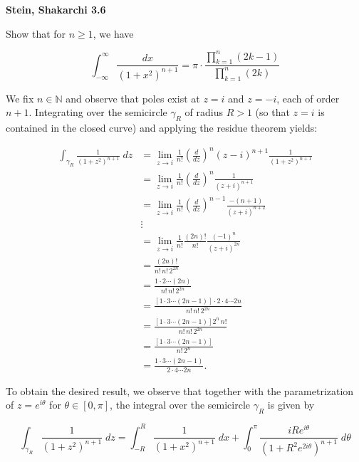 \textbf{Stein, Shakarchi 3.6}

Show that for $n \ge 1$, we have

$$
  \int_{-\infty}^{\infty} {\frac{dx}{\left( 1 + x^2 \right)^{n+1}}} = \pi \cdot \frac{\prod\limits_{k=1}^{n} (2k - 1)}{\prod\limits_{k=1}^{n} (2k)}
$$

\begin{solution}
  We fix $n \in \mathbb{N}$ and observe that poles exist at $z = i$ and $z = -i$, each of order $n + 1$. Integrating 
  over the semicircle $\gamma_R$ of radius $R > 1$ (so that $z = i$ is contained in the closed curve) and applying the 
  residue theorem yields:

  \begin{align*}
    \int_{\gamma_R} { \frac{1}{(1 + z^2)^{n+1}} \; dz } 
      &= \lim\limits_{z \to i} \frac{1}{n!} \left(\frac{d}{dz}\right)^n (z - i)^{n+1} \frac{1}{(1 + z^2)^{n+1}} \\
      &= \lim\limits_{z \to i} \frac{1}{n!} \left(\frac{d}{dz}\right)^n \frac{1}{(z + i)^{n+1}} \\
      &= \lim\limits_{z \to i} \frac{1}{n!} \left(\frac{d}{dz}\right)^{n-1} \frac{-(n+1)}{(z + i)^{n+2}} \\
      &\vdots \\
      &= \lim\limits_{z \to i} \frac{1}{n!} \frac{(2n)!}{n!} \frac{(-1)^n}{(z + i)^{2n}} \\
      &= \frac{(2n)!}{n! \, n! \, 2^{2n}} \\
      &= \frac{1 \cdot 2 \cdots (2n)}{n! \, n! \, 2^{2n}} \\
      &= \frac{[1 \cdot 3 \cdots (2n - 1)] \cdot 2 \cdot 4 \cdots 2n}{n! \, n! \, 2^{2n}} \\
      &= \frac{[1 \cdot 3 \cdots (2n - 1)] 2^n \, n!}{n! \, n! \, 2^{2n}} \\
      &= \frac{[1 \cdot 3 \cdots (2n - 1)]}{n! \, 2^n} \\
      &= \frac{1 \cdot 3 \cdots (2n - 1)}{2 \cdot 4 \cdots 2n}.
  \end{align*}

  To obtain the desired result, we observe that together with the parametrization of 
  $z = e^{i \theta}$ for $\theta \in [0, \pi]$, the integral over the semicircle $\gamma_R$ is given by

  $$
    \int_{\gamma_R} { \frac{1}{(1 + z^2)^{n+1}} \; dz } = \int_{-R}^{R} { \frac{1}{(1 + x^2)^{n+1}} \; dx } 
                                                        + \int_0^{\pi} { \frac{i R e^{i \theta}}{\left(1 + R^2 e^{2 i \theta}\right)^{n+1}} \; d\theta }
  $$


\end{solution}

